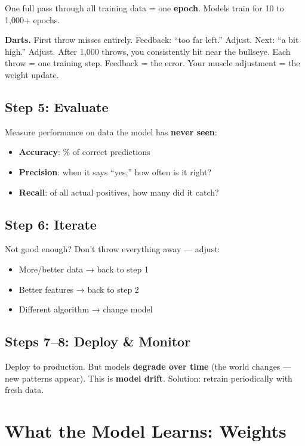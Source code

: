\documentclass[11pt,a4paper]{report}
\begin{document}
One full pass through all training data = one \textbf{epoch}. Models train for 10 to 1,000+ epochs.

\begin{analogybox}
\textbf{Darts.} First throw misses entirely. Feedback: ``too far left.'' Adjust. Next: ``a bit high.'' Adjust. After 1,000 throws, you consistently hit near the bullseye. Each throw = one training step. Feedback = the error. Your muscle adjustment = the weight update.
\end{analogybox}

\subsection{Step 5: Evaluate}

Measure performance on data the model has \textbf{never seen}:
\begin{itemize}
    \item \textbf{Accuracy}: \% of correct predictions
    \item \textbf{Precision}: when it says ``yes,'' how often is it right?
    \item \textbf{Recall}: of all actual positives, how many did it catch?
\end{itemize}

\subsection{Step 6: Iterate}

Not good enough? Don't throw everything away --- adjust:
\begin{itemize}
    \item More/better data → back to step 1
    \item Better features → back to step 2
    \item Different algorithm → change model
\end{itemize}

\subsection{Steps 7--8: Deploy \& Monitor}

Deploy to production. But models \textbf{degrade over time} (the world changes --- new patterns appear). This is \textbf{model drift}. Solution: retrain periodically with fresh data.

\section{What the Model Learns: Weights}
\end{document}
